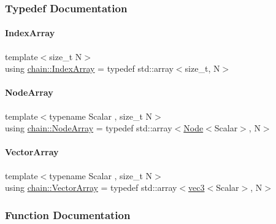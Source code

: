 \subsubsection{Typedef Documentation}
\mbox{\label{namespacechain_aa40d2da395c0ac2bc5f37832442ac403}} 
\paragraph{\texorpdfstring{Index\+Array}{IndexArray}}
{\footnotesize\ttfamily template$<$size\+\_\+t N$>$ \\
using \mbox{\hyperlink{namespacechain_aa40d2da395c0ac2bc5f37832442ac403}{chain\+::\+Index\+Array}} = typedef std\+::array$<$size\+\_\+t, N$>$}

\mbox{\label{namespacechain_a3a021b84403e03113e1dcd61ba304963}} 
\paragraph{\texorpdfstring{Node\+Array}{NodeArray}}
{\footnotesize\ttfamily template$<$typename Scalar , size\+\_\+t N$>$ \\
using \mbox{\hyperlink{namespacechain_a3a021b84403e03113e1dcd61ba304963}{chain\+::\+Node\+Array}} = typedef std\+::array$<$\mbox{\hyperlink{structchain_1_1_node}{Node}}$<$Scalar$>$, N$>$}

\mbox{\label{namespacechain_aa715d2f046187ea9f0c3ea55605d6214}} 
\paragraph{\texorpdfstring{Vector\+Array}{VectorArray}}
{\footnotesize\ttfamily template$<$typename Scalar , size\+\_\+t N$>$ \\
using \mbox{\hyperlink{namespacechain_aa715d2f046187ea9f0c3ea55605d6214}{chain\+::\+Vector\+Array}} = typedef std\+::array$<$\mbox{\hyperlink{structvec3}{vec3}}$<$Scalar$>$, N$>$}



\subsubsection{Function Documentation}
\mbox{\label{namespacechain_a68d5d08ece7d82a6b4bb1968b783a8f3}} 

